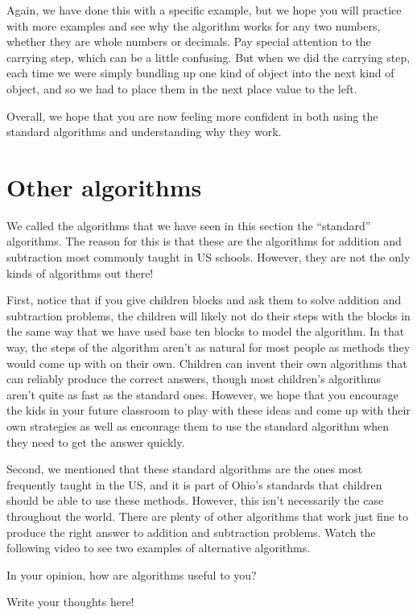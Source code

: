 \documentclass{ximera}
\begin{document}
Again, we have done this with a specific example, but we hope you will practice with more examples and see why the algorithm works for any two numbers, whether they are whole numbers or decimals. Pay special attention to the carrying step, which can be a little confusing. But when we did the carrying step, each time we were simply bundling up one kind of object into the next kind of object, and so we had to place them in the next place value to the left.

Overall, we hope that you are now feeling more confident in both using the standard algorithms and understanding why they work.





\section{Other algorithms}

We called the algorithms that we have seen in this section the ``standard'' algorithms. The reason for this is that these are the algorithms for addition and subtraction most commonly taught in US schools. However, they are not the only kinds of algorithms out there!

First, notice that if you give children blocks and ask them to solve addition and subtraction problems, the children will likely not do their steps with the blocks in the same way that we have used base ten blocks to model the algorithm. In that way, the steps of the algorithm aren't as natural for most people as methods they would come up with on their own. Children can invent their own algorithms that can reliably produce the correct answers, though most children's algorithms aren't quite as fast as the standard ones. However, we hope that you encourage the kids in your future classroom to play with these ideas and come up with their own strategies as well as encourage them to use the standard algorithm when they need to get the answer quickly.

Second, we mentioned that these standard algorithms are the ones most frequently taught in the US, and it is part of Ohio's standards that children should be able to use these methods. However, this isn't necessarily the case throughout the world. There are plenty of other algorithms that work just fine to produce the right answer to addition and subtraction problems. Watch the following video to see two examples of alternative algorithms.


\begin{question}
In your opinion, how are algorithms useful to you?
\begin{freeResponse}
Write your thoughts here!
\end{freeResponse}
\end{question}
\end{document}
